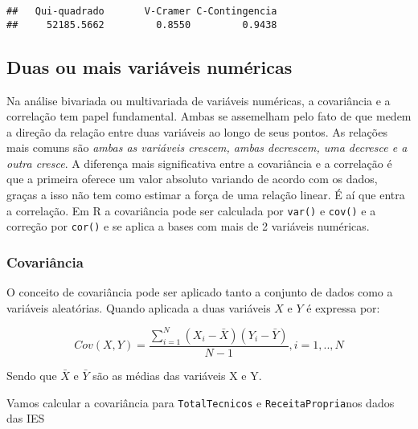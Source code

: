 \documentclass[11pt,]{style/krantz}
\makeatletter
\newenvironment{Shaded}{\begin{snugshade}}{\end{snugshade}}
\newcommand{\DataTypeTok}[1]{\textcolor[rgb]{0.13,0.29,0.53}{#1}}
\newcommand{\KeywordTok}[1]{\textcolor[rgb]{0.13,0.29,0.53}{\textbf{#1}}}
\newcommand{\NormalTok}[1]{#1}
\newcommand{\OperatorTok}[1]{\textcolor[rgb]{0.81,0.36,0.00}{\textbf{#1}}}
\newcommand{\OtherTok}[1]{\textcolor[rgb]{0.56,0.35,0.01}{#1}}
\newcommand{\StringTok}[1]{\textcolor[rgb]{0.31,0.60,0.02}{#1}}
\newenvironment{kframe}{%
\medskip{}
\setlength{\fboxsep}{.8em}
 \def\at@end@of@kframe{}%
 \ifinner\ifhmode%
  \def\at@end@of@kframe{\end{minipage}}%
  \begin{minipage}{\columnwidth}%
 \fi\fi%
 \def\FrameCommand##1{\hskip\@totalleftmargin \hskip-\fboxsep
 \colorbox{shadecolor}{##1}\hskip-\fboxsep
     \hskip-\linewidth \hskip-\@totalleftmargin \hskip\columnwidth}%
 \MakeFramed {\advance\hsize-\width
   \@totalleftmargin\z@ \linewidth\hsize
   \@setminipage}}%
 {\par\unskip\endMakeFramed%
 \at@end@of@kframe}
\renewenvironment{Shaded}{\begin{kframe}}{\end{kframe}}
\theoremstyle{definition}
\theoremstyle{definition}
\theoremstyle{definition}
\theoremstyle{remark}
\let\BeginKnitrBlock\begin \let\EndKnitrBlock\end
\makeatother
\begin{document}
\begin{verbatim}
##   Qui-quadrado       V-Cramer C-Contingencia 
##     52185.5662         0.8550         0.9438
\end{verbatim}

\hypertarget{duas-ou-mais-variaveis-numericas}{%
\subsection{Duas ou mais variáveis numéricas}\label{duas-ou-mais-variaveis-numericas}}

Na análise bivariada ou multivariada de variáveis numéricas, a covariância e a correlação tem papel fundamental. Ambas se assemelham pelo fato de que medem a direção da relação entre duas variáveis ao longo de seus pontos. As relações mais comuns são \emph{ambas as variáveis crescem, ambas decrescem, uma decresce e a outra cresce}. A diferença mais significativa entre a covariância e a correlação é que a primeira oferece um valor absoluto variando de acordo com os dados, graças a isso não tem como estimar a força de uma relação linear. É aí que entra a correlação. Em R a covariância pode ser calculada por \texttt{var()} e \texttt{cov()} e a correção por \texttt{cor()} e se aplica a bases com mais de 2 variáveis numéricas.

\hypertarget{covariancia}{%
\subsubsection{Covariância}\label{covariancia}}

O conceito de covariância pode ser aplicado tanto a conjunto de dados como a variáveis aleatórias. Quando aplicada a duas variáveis \(X\) e \(Y\) é expressa por:

\[Cov(X,Y) = \frac {\sum_{i=1}^N(X_i-\bar X)(Y_i - \bar Y)}{N-1}, i=1,..,N\]

Sendo que \(\bar X\) e \(\bar Y\) são as médias das variáveis X e Y.

\BeginKnitrBlock{example}
\protect\hypertarget{exm:unnamed-chunk-102}{}{\label{exm:unnamed-chunk-102} }Vamos calcular a covariância para \texttt{TotalTecnicos} e \texttt{ReceitaPropria}nos dados das IES
\EndKnitrBlock{example}

\begin{Shaded}
\end{Shaded}
\end{document}
